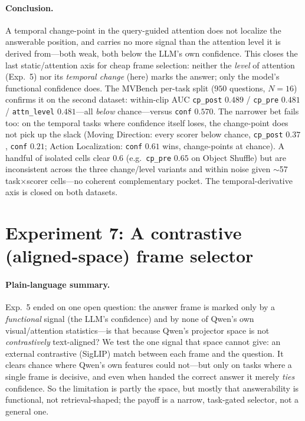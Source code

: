 \documentclass[11pt]{article}
\begin{document}
\paragraph{Conclusion.} A temporal change-point in the query-guided attention does not localize
the answerable position, and carries no more signal than the attention level it is derived
from---both weak, both below the LLM's own confidence. This closes the last static/attention
axis for cheap frame selection: neither the \emph{level} of attention (Exp.~5) nor its
\emph{temporal change} (here) marks the answer; only the model's functional confidence does.
The MVBench per-task split ($950$ questions, $N{=}16$) confirms it on the second dataset:
within-clip AUC \texttt{cp\_post} $0.489$ / \texttt{cp\_pre} $0.481$ / \texttt{attn\_level}
$0.481$---all \emph{below} chance---versus \texttt{conf} $0.570$. The narrower bet fails too: on
the temporal tasks where confidence itself loses, the change-point does not pick up the slack
(Moving Direction: every scorer below chance, \texttt{cp\_post} $0.37$, \texttt{conf} $0.21$;
Action Localization: \texttt{conf} $0.61$ wins, change-points at chance). A handful of isolated
cells clear $0.6$ (e.g.\ \texttt{cp\_pre} $0.65$ on Object Shuffle) but are inconsistent across
the three change/level variants and within noise given $\sim$57 task$\times$scorer cells---no
coherent complementary pocket. The temporal-derivative axis is closed on both datasets.

\section{Experiment 7: A contrastive (aligned-space) frame selector}

\paragraph{Plain-language summary.}
Exp.~5 ended on one open question: the answer frame is marked only by a \emph{functional}
signal (the LLM's confidence) and by none of Qwen's own visual/attention statistics---is that
because Qwen's projector space is not \emph{contrastively} text-aligned? We test the one signal
that space cannot give: an external contrastive (SigLIP) match between each frame and the
question. It clears chance where Qwen's own features could not---but only on tasks where a
single frame is decisive, and even when handed the correct answer it merely \emph{ties}
confidence. So the limitation is partly the space, but mostly that answerability is functional,
not retrieval-shaped; the payoff is a narrow, task-gated selector, not a general one.
\end{document}

